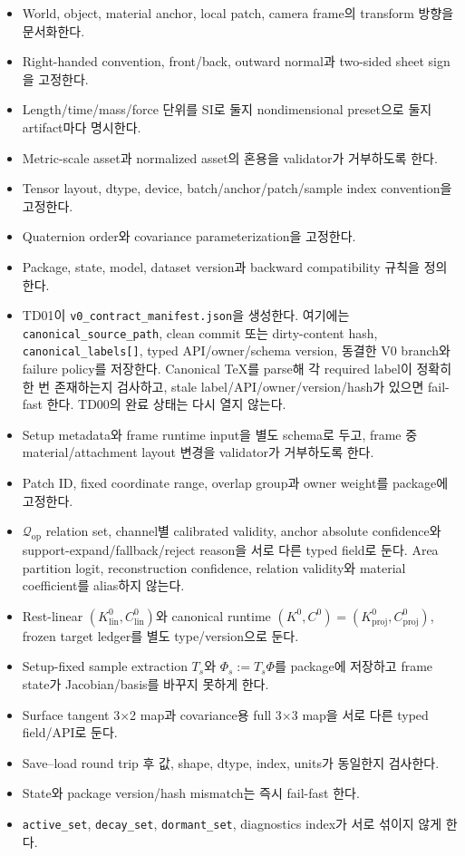 \documentclass[10pt,a4paper]{article}
\newcommand{\todo}{\textcolor{TodoGray}{\(\square\)}}
\newcommand{\code}[1]{\texttt{#1}}
\newcommand{\artifact}[1]{\textcolor{ProgressBlue}{\nolinkurl{#1}}}
\begin{document}
\begin{itemize}
  \item[\todo] World, object, material anchor, local patch, camera frame의 transform 방향을 문서화한다.
  \item[\todo] Right-handed convention, front/back, outward normal과 two-sided sheet sign을 고정한다.
  \item[\todo] Length/time/mass/force 단위를 SI로 둘지 nondimensional preset으로 둘지 artifact마다 명시한다.
  \item[\todo] Metric-scale asset과 normalized asset의 혼용을 validator가 거부하도록 한다.
  \item[\todo] Tensor layout, dtype, device, batch/anchor/patch/sample index convention을 고정한다.
  \item[\todo] Quaternion order와 covariance parameterization을 고정한다.
  \item[\todo] Package, state, model, dataset version과 backward compatibility 규칙을 정의한다.
  \item[\todo] TD01이 \artifact{v0_contract_manifest.json}을 생성한다. 여기에는
  \code{canonical\_source\_path}, clean commit 또는 dirty-content hash,
  \code{canonical\_labels[]}, typed API/owner/schema version, 동결한 V0 branch와 failure policy를 저장한다.
  Canonical TeX를 parse해 각 required label이 정확히 한 번 존재하는지 검사하고,
  stale label/API/owner/version/hash가 있으면 fail-fast 한다. TD00의 완료 상태는 다시 열지 않는다.
  \item[\todo] Setup metadata와 frame runtime input을 별도 schema로 두고, frame 중 material/attachment layout 변경을 validator가 거부하도록 한다.
  \item[\todo] Patch ID, fixed coordinate range, overlap group과 owner weight를 package에 고정한다.
  \item[\todo] \(\mathcal Q_{\mathrm{op}}\) relation set, channel별 calibrated validity,
  anchor absolute confidence와 support-expand/fallback/reject reason을 서로 다른 typed field로 둔다.
  Area partition logit, reconstruction confidence, relation validity와 material coefficient를 alias하지 않는다.
  \item[\todo] Rest-linear \((K_{\mathrm{lin}}^0,C_{\mathrm{lin}}^0)\)와 canonical runtime
  \((K^0,C^0)=(K_{\mathrm{proj}}^0,C_{\mathrm{proj}}^0)\), frozen target ledger를 별도 type/version으로 둔다.
  \item[\todo] Setup-fixed sample extraction \(T_s\)와
  \(\Phi_s:=T_s\Phi\)를 package에 저장하고 frame state가 Jacobian/basis를 바꾸지 못하게 한다.
  \item[\todo] Surface tangent 3\(\times\)2 map과 covariance용 full 3\(\times\)3 map을 서로 다른 typed field/API로 둔다.
  \item[\todo] Save--load round trip 후 값, shape, dtype, index, units가 동일한지 검사한다.
  \item[\todo] State와 package version/hash mismatch는 즉시 fail-fast 한다.
  \item[\todo] \code{active\_set}, \code{decay\_set}, \code{dormant\_set}, diagnostics index가 서로 섞이지 않게 한다.
\end{itemize}
\end{document}
